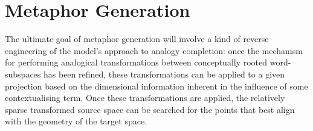\section{Metaphor Generation}
The ultimate goal of metaphor generation will involve a kind of reverse engineering of the model's approach to analogy completion: once the mechanism for performing analogical transformations between conceptually rooted word-subspaces has been refined, these transformations can be applied to a given projection based on the dimensional information inherent in the influence of some contextualising term.  Once these transformations are applied, the relatively sparse transformed source space can be searched for the points that best align with the geometry of the target space.
